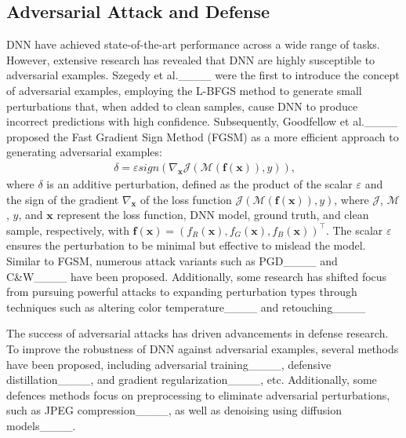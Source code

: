 \subsection{Adversarial Attack and Defense} \label{sec2.4}
DNN have achieved state-of-the-art performance across a wide range of tasks. However, extensive research has revealed that DNN are highly susceptible to adversarial examples. Szegedy et al.____ were the first to introduce the concept of adversarial examples, employing the L-BFGS method to generate small perturbations that, when added to clean samples, cause DNN to produce incorrect predictions with high confidence. Subsequently, Goodfellow et al.____ proposed the Fast Gradient Sign Method (FGSM) as a more efficient approach to generating adversarial examples:
\begin{equation}~\label{eq4}
\begin{gathered}
    \delta = \varepsilon sign\left( {{\nabla }_{\boldsymbol{x}}}\mathcal{J} \left( \mathcal{M}\left( \boldsymbol{f}(\boldsymbol{x}) \right),y \right) \right),
\end{gathered}
\end{equation}
where \(\delta\) is an additive perturbation, defined as the product of the scalar \(\varepsilon\) and the sign of the gradient \(\nabla_{\boldsymbol{x}}\) of the loss function \(\mathcal{J}(\mathcal{M}(\boldsymbol{f}(\boldsymbol{x})), y)\), where $\mathcal{J}$, $\mathcal{M}$, $y$, and $\boldsymbol{x}$ represent the loss function, DNN model, ground truth, and clean sample, respectively, with $\boldsymbol{f}(\boldsymbol{x}) = \left( f_R{(\boldsymbol{x})}, f_G{(\boldsymbol{x})}, f_B{(\boldsymbol{x})} \right)^\top$. The scalar \(\varepsilon\) ensures the perturbation to be minimal but effective to mislead the model. Similar to FGSM, numerous attack variants such as PGD____ and C\&W____ have been proposed. Additionally, some research has shifted focus from pursuing powerful attacks to expanding perturbation types through techniques such as altering color temperature____ and retouching____
\par The success of adversarial attacks has driven advancements in defense research. To improve the robustness of DNN against adversarial examples, several methods have been proposed, including adversarial training____, defensive distillation____, and gradient regularization____, etc. Additionally, some defences methods focus on preprocessing to eliminate adversarial perturbations, such as JPEG compression____, as well as denoising using diffusion models____.
